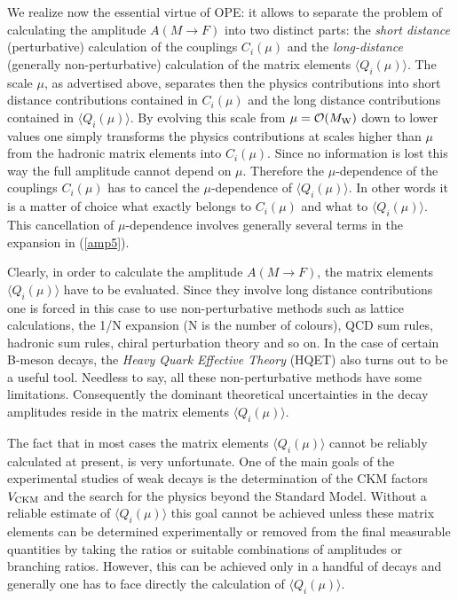 \documentclass[12pt]{article}
\newcommand{\mw}{M_{\rm W}}
\newcommand{\ord}{{\cal O}}
\begin{document}
We realize now the essential virtue of OPE: it allows to separate the problem
of calculating the amplitude
$A(M\to F)$ into two distinct parts: the {\it short distance}
(perturbative) calculation of the couplings $C_i(\mu)$ and 
the {\it long-distance} (generally non-perturbative) calculation of 
the matrix elements $\langle Q_i(\mu)\rangle$. The scale $\mu$, as
advertised above, separates then the physics contributions into short
distance contributions contained in $C_i(\mu)$ and the long distance 
contributions
contained in $\langle Q_i(\mu)\rangle$. By evolving this scale from 
$\mu=\ord(\mw)$ down to lower values one
simply transforms the physics contributions at scales higher than $\mu$ 
from the hadronic matrix elements into $C_i(\mu)$. Since no information 
is lost this way the full amplitude cannot depend on $\mu$. Therefore 
the $\mu$-dependence of the couplings $C_i(\mu)$ has to cancel the 
$\mu$-dependence of $\langle Q_i(\mu)\rangle$. In other words it is a
matter of choice what exactly belongs to $C_i(\mu)$ and what to 
$\langle Q_i(\mu)\rangle$. This cancellation
of $\mu$-dependence involves generally several terms in the expansion 
in (\ref{amp5}).

Clearly, in order to calculate the amplitude $A(M\to F)$, the matrix 
elements $\langle Q_i(\mu)\rangle$ have to be evaluated. 
Since they involve long distance contributions one is forced in
this case to use non-perturbative methods such as lattice calculations, the
1/N expansion (N is the number of colours), QCD sum rules, hadronic sum rules,
chiral perturbation theory and so on. In the case of certain B-meson decays,
the {\it Heavy Quark Effective Theory} (HQET) also turns out to be a 
useful tool.
Needless to say, all these non-perturbative methods have some limitations.
Consequently the dominant theoretical uncertainties in the decay amplitudes
reside in the matrix elements $\langle Q_i(\mu)\rangle$.

The fact that in most cases the matrix elements $\langle Q_i(\mu)\rangle$
 cannot be reliably
calculated at present, is very unfortunate. One of the main goals of the
experimental studies of weak decays is the determination of the CKM factors 
$V_{\rm CKM}$
and the search for the physics beyond the Standard Model. Without a reliable
estimate of $\langle Q_i(\mu)\rangle$ this goal cannot be achieved unless 
these matrix elements can be determined experimentally or removed from the 
final measurable quantities
by taking the ratios or suitable combinations of amplitudes or branching
ratios. However, this can be achieved only in a handful of decays and
generally one has to face directly the calculation of 
$\langle Q_i(\mu)\rangle$.
\end{document}
